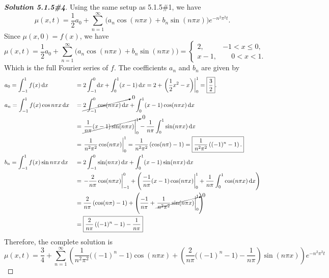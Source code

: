 \documentclass[letterpaper,11pt]{article} %
\theoremstyle{plain}
\begin{document}
\begin{proof}[\textbf{Solution 5.1.5\#4}] %
    Using the same setup as 5.1.5\#1, we have \begin{equation*}
    \mu(x,t) = \frac{1}{2} a_0 + \sum_{n=1}^\infty \Big( a_n \cos \left(n \pi x\right) + b_n \sin \left( n\pi x \right) \Big) e^{-n^2 \pi^2 t}.
    \end{equation*}
     Since $\mu(x, 0) = f(x)$, we have
    \begin{equation*}
    \mu(x,t) = \frac{1}{2} a_0 + \sum_{n=1}^\infty \Big( a_n \cos \left(n \pi x\right) + b_n \sin \left( n\pi x \right) \Big) = \begin{cases} 2, & -1 < x \leq 0, \\ x -1, & \phantom{-}0 < x < 1. \end{cases}
    \end{equation*}
    Which is the full Fourier series of $f$. The coefficients $a_n$ and $b_n$ are given by
    \begin{align*}
        &a_0 = \int_{-1}^1 f(x) \, \mathrm dx& &= 2\int_{-1}^0 \!\mathrm{d}x + \int_0^1 (x-1) \, \mathrm{d}x = 2 + \left.\left(\frac{1}{2}x^2 - x\right)\right|_0^1 = \boxed{\frac{3}{2}}. \\
        &a_n= \int_{-1}^1 f(x) \cos n \pi x \, \mathrm{d}x& &= \cancelto{0}{2 \int_{-1}^0 \cos(n\pi x)\,\mathrm{d}x} + \int_0^1 (x-1) \cos (n \pi x) \,\mathrm{d}x \\
        &&&= \cancelto{0}{\left.\frac{1}{n\pi}(x-1)\sin(n\pi x)\right|_0^1}  - \frac{1}{n\pi}\int_0^1 \sin(n \pi x) \, \mathrm dx \\
        &&& = \left.\frac{1}{n^2 \pi^2} \cos (n\pi x) \right|_0^1 = \frac{1}{n^2 \pi^2}\left(\cos (n \pi) - 1\right) = \boxed{\frac{1}{n^2 \pi^2} \left( (-1)^{n} - 1\right).}\\
        &b_n = \int_{-1}^1 f(x) \sin n \pi x \, \mathrm{d}x& &= 2 \int_{-1}^0 \sin(n\pi x)\,\mathrm{d}x + \int_0^1 (x-1) \sin (n \pi x) \,\mathrm{d}x \\
        &&& = \left.-\frac{2}{n \pi} \cos(n\pi x)\right|_{-1}^0 + \left(\left.\frac{-1}{n\pi}(x-1)\cos(n\pi x)\right|_0^1 + \frac{1}{n\pi}\int_0^1 \cos(n\pi x)\,\mathrm{d}x\right) \\
        &&&=\frac{2}{n\pi} \left(\cos(n\pi) -1 \right) + \left(\frac{-1}{n\pi} + \cancelto{0}{\left.\frac{1}{n^2 \pi^2} \sin(n\pi x) \right|_0^1}\right) \\
        &&&=\boxed{\frac{2}{n\pi}\left((-1)^n - 1\right) - \frac{1}{n\pi}}
    \end{align*}
    Therefore, the complete solution is
    \begin{equation*}
    \boxed{\mu(x,t) = \frac{3}{4} + \sum_{n=1}^\infty \left( \frac{1}{n^2 \pi^2} \Big( (-1)^{n} - 1\Big)\cos(n\pi x) + \left(\frac{2}{n\pi}\Big((-1)^n - 1\Big) - \frac{1}{n\pi}\right) \sin(n\pi x) \right)e^{-n^2 \pi^2 t}}
    \end{equation*}
\end{proof}
\end{document}
